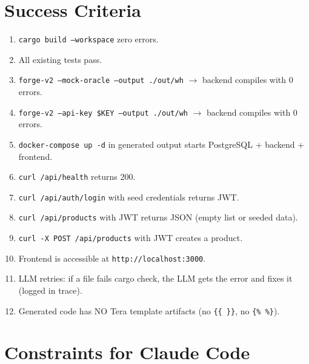 \documentclass[11pt,a4paper]{article}
\begin{document}
\section{Success Criteria}

\begin{enumerate}
\item \texttt{cargo build --workspace} zero errors.
\item All existing tests pass.
\item \texttt{forge-v2 --mock-oracle --output ./out/wh} $\to$
  backend compiles with 0 errors.
\item \texttt{forge-v2 --api-key \$KEY --output ./out/wh} $\to$
  backend compiles with 0 errors.
\item \texttt{docker-compose up -d} in generated output starts
  PostgreSQL + backend + frontend.
\item \texttt{curl /api/health} returns 200.
\item \texttt{curl /api/auth/login} with seed credentials returns JWT.
\item \texttt{curl /api/products} with JWT returns JSON (empty list or seeded data).
\item \texttt{curl -X POST /api/products} with JWT creates a product.
\item Frontend is accessible at \texttt{http://localhost:3000}.
\item LLM retries: if a file fails cargo check, the LLM gets the
  error and fixes it (logged in trace).
\item Generated code has NO Tera template artifacts (no \texttt{\{\{ \}\}},
  no \texttt{\{\% \%\}}).
\end{enumerate}

\section{Constraints for Claude Code}
\end{document}
